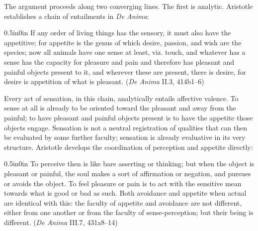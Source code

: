 The argument proceeds along two converging lines. The first is analytic. Aristotle establishes a chain of entailments in \textit{De Anima}:
\begin{adjustwidth}{0.5in}{0in}
If any order of living things has the sensory, it must also have the appetitive; for appetite is the genus of which desire, passion, and wish are the species; now all animals have one sense at least, viz. touch, and whatever has a sense has the capacity for pleasure and pain and therefore has pleasant and painful objects present to it, and wherever these are present, there is desire, for desire is appetition of what is pleasant. (\textit{De Anima} II.3, 414b1--6)
\end{adjustwidth}
Every act of sensation, in this chain, analytically entails affective valence. To sense at all is already to be oriented toward the pleasant and away from the painful; to have pleasant and painful objects present is to have the appetite those objects engage. Sensation is not a neutral registration of qualities that can then be evaluated by some further faculty; sensation is already evaluative in its very structure. Aristotle develops the coordination of perception and appetite directly:
\begin{adjustwidth}{0.5in}{0in}
To perceive then is like bare asserting or thinking; but when the object is pleasant or painful, the soul makes a sort of affirmation or negation, and pursues or avoids the object. To feel pleasure or pain is to act with the sensitive mean towards what is good or bad as such. Both avoidance and appetite when actual are identical with this: the faculty of appetite and avoidance are not different, either from one another or from the faculty of sense-perception; but their being is different. (\textit{De Anima} III.7, 431a8--14)
\end{adjustwidth}
